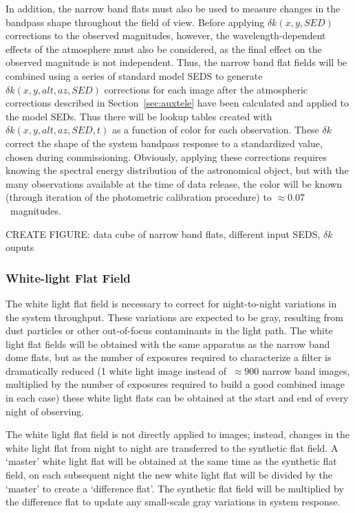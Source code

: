 \documentclass[12pt,preprint]{aastex}
\begin{document}
In addition, the narrow band flats must also be used to measure
changes in the bandpass shape throughout the field of view. Before
applying $\delta k(x,y,SED)$ corrections to the observed magnitudes,
however, the wavelength-dependent effects of the atmosphere must also
be considered, as the final effect on the observed magnitude is not
independent. Thus, the narrow band flat fields will be combined using
a series of standard model SEDS to generate
$\delta k(x,y,alt,az,SED)$ corrections for each image after the atmospheric
corrections described in Section~\ref{sec:auxtele} have been
calculated and applied to the model SEDs. Thus there will be lookup
tables created with $\delta k(x,y,alt,az,SED,t)$ as a function of
color for each observation. These $\delta k$ correct the shape of the
system bandpass response to a standardized value, chosen during
commissioning.  Obviously, applying these corrections requires knowing
the spectral energy distribution of the astronomical object, but with
the many observations available at the time of data release, the color
will be known (through iteration of the photometric calibration
procedure) to $\approx 0.07$~magnitudes.

CREATE FIGURE: data cube of narrow band flats, different input SEDS,
$\delta k$ ouputs

\subsubsection{White-light Flat Field}

The white light flat field is necessary to correct for night-to-night
variations in the system throughput. These variations are expected to
be gray, resulting from dust particles or other out-of-focus
contaminants in the light path. The white light flat fields will be
obtained with the same apparatus as the narrow band dome flats, but as
the number of exposures required to characterize a filter is
dramatically reduced (1 white light image instead of $~\approx900$
narrow band images, multiplied by the number of exposures required to
build a good combined image in each case) these white light flats can
be obtained at the start and end of every night of observing.

The white light flat field is not directly applied to images; instead,
changes in the white light flat from night to night are transferred to
the synthetic flat field. A `master' white light flat will be obtained at the
same time as the synthetic flat field, on each subsequent night the
new white light flat will be divided by the `master' to create a
`difference flat'. The synthetic flat field will be multiplied by the
difference flat to update any small-scale gray variations in system
response. 
\end{document}

